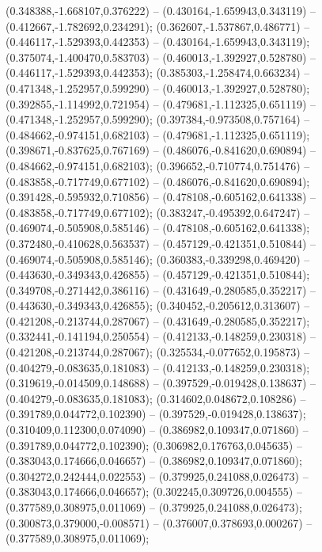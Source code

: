  (0.348388,-1.668107,0.376222) -- (0.430164,-1.659943,0.343119) -- (0.412667,-1.782692,0.234291);
 (0.362607,-1.537867,0.486771) -- (0.446117,-1.529393,0.442353) -- (0.430164,-1.659943,0.343119);
 (0.375074,-1.400470,0.583703) -- (0.460013,-1.392927,0.528780) -- (0.446117,-1.529393,0.442353);
 (0.385303,-1.258474,0.663234) -- (0.471348,-1.252957,0.599290) -- (0.460013,-1.392927,0.528780);
 (0.392855,-1.114992,0.721954) -- (0.479681,-1.112325,0.651119) -- (0.471348,-1.252957,0.599290);
 (0.397384,-0.973508,0.757164) -- (0.484662,-0.974151,0.682103) -- (0.479681,-1.112325,0.651119);
 (0.398671,-0.837625,0.767169) -- (0.486076,-0.841620,0.690894) -- (0.484662,-0.974151,0.682103);
 (0.396652,-0.710774,0.751476) -- (0.483858,-0.717749,0.677102) -- (0.486076,-0.841620,0.690894);
 (0.391428,-0.595932,0.710856) -- (0.478108,-0.605162,0.641338) -- (0.483858,-0.717749,0.677102);
 (0.383247,-0.495392,0.647247) -- (0.469074,-0.505908,0.585146) -- (0.478108,-0.605162,0.641338);
 (0.372480,-0.410628,0.563537) -- (0.457129,-0.421351,0.510844) -- (0.469074,-0.505908,0.585146);
 (0.360383,-0.339298,0.469420) -- (0.443630,-0.349343,0.426855) -- (0.457129,-0.421351,0.510844);
 (0.349708,-0.271442,0.386116) -- (0.431649,-0.280585,0.352217) -- (0.443630,-0.349343,0.426855);
 (0.340452,-0.205612,0.313607) -- (0.421208,-0.213744,0.287067) -- (0.431649,-0.280585,0.352217);
 (0.332441,-0.141194,0.250554) -- (0.412133,-0.148259,0.230318) -- (0.421208,-0.213744,0.287067);
 (0.325534,-0.077652,0.195873) -- (0.404279,-0.083635,0.181083) -- (0.412133,-0.148259,0.230318);
 (0.319619,-0.014509,0.148688) -- (0.397529,-0.019428,0.138637) -- (0.404279,-0.083635,0.181083);
 (0.314602,0.048672,0.108286) -- (0.391789,0.044772,0.102390) -- (0.397529,-0.019428,0.138637);
 (0.310409,0.112300,0.074090) -- (0.386982,0.109347,0.071860) -- (0.391789,0.044772,0.102390);
 (0.306982,0.176763,0.045635) -- (0.383043,0.174666,0.046657) -- (0.386982,0.109347,0.071860);
 (0.304272,0.242444,0.022553) -- (0.379925,0.241088,0.026473) -- (0.383043,0.174666,0.046657);
 (0.302245,0.309726,0.004555) -- (0.377589,0.308975,0.011069) -- (0.379925,0.241088,0.026473);
 (0.300873,0.379000,-0.008571) -- (0.376007,0.378693,0.000267) -- (0.377589,0.308975,0.011069);
